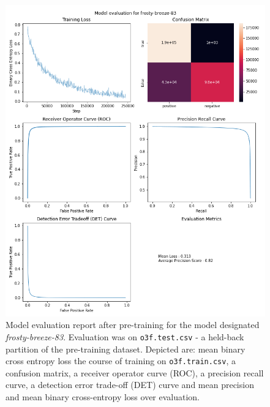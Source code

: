 \documentclass{article}
\begin{document}
\begin{figure}
	\caption{\label{frostybreeze} Model evaluation report after pre-training for the model designated \textit{frosty-breeze-83}. Evaluation was on \texttt{o3f.test.csv} - a held-back partition of the pre-training dataset. Depicted are:
	mean binary cross entropy loss the course of training on \texttt{o3f.train.csv},  
	a confusion matrix, 
	a receiver operator curve (ROC), 
	a precision recall curve,
	a detection error trade-off (DET) curve and 
	mean precision and mean binary cross-entropy loss over evaluation.}
	\includegraphics[width = \textwidth]{img/frosty-breeze-83-eval.png}
\end{figure}
\end{document}
